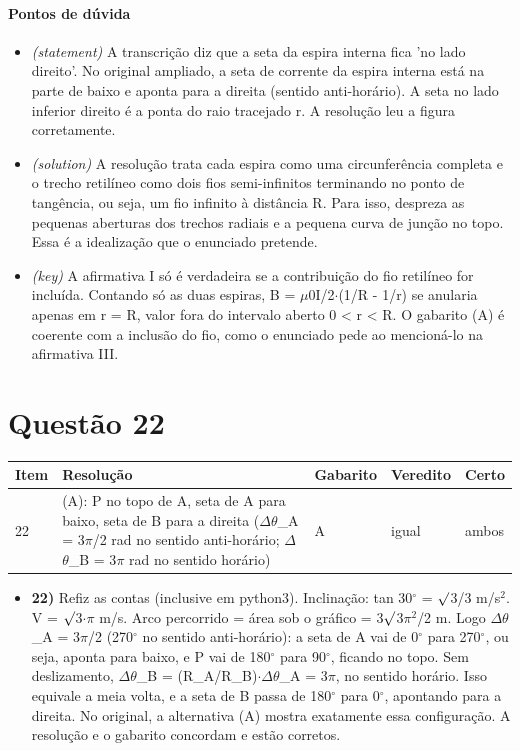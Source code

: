 \documentclass{article}%
\begin{document}
\paragraph{Pontos de dúvida}%
\begin{itemize}%
\item%
\textit{(statement)} A transcrição diz que a seta da espira interna fica 'no lado direito'. No original ampliado, a seta de corrente da espira interna está na parte de baixo e aponta para a direita (sentido anti{-}horário). A seta no lado inferior direito é a ponta do raio tracejado r. A resolução leu a figura corretamente.%
\item%
\textit{(solution)} A resolução trata cada espira como uma circunferência completa e o trecho retilíneo como dois fios semi{-}infinitos terminando no ponto de tangência, ou seja, um fio infinito à distância R. Para isso, despreza as pequenas aberturas dos trechos radiais e a pequena curva de junção no topo. Essa é a idealização que o enunciado pretende.%
\item%
\textit{(key)} A afirmativa I só é verdadeira se a contribuição do fio retilíneo for incluída. Contando só as duas espiras, B = $\mu$0I/2$\cdot$(1/R - 1/r) se anularia apenas em r = R, valor fora do intervalo aberto 0 < r < R. O gabarito (A) é coerente com a inclusão do fio, como o enunciado pede ao mencioná{-}lo na afirmativa III.%
\end{itemize}%
\section*{Questão 22}%
\begin{longtable}{@{}p{} p{} p{} p{} p{}@{}}\toprule Item & Resolução & Gabarito & Veredito & Certo \\ \midrule
22 & (A): P no topo de A, seta de A para baixo, seta de B para a direita ($\Delta$$\theta$\_A = 3$\pi$/2 rad no sentido anti{-}horário; $\Delta$$\theta$\_B = 3$\pi$ rad no sentido horário) & A & igual & ambos \\
\bottomrule\end{longtable}%
\begin{itemize}%
\item%
\textbf{22)} Refiz as contas (inclusive em python3). Inclinação: tan 30$^\circ$ = $\surd$3/3 m/s$^2$. V = $\surd$3$\cdot$$\pi$ m/s. Arco percorrido = área sob o gráfico = 3$\surd$3$\pi$$^2$/2 m. Logo $\Delta$$\theta$\_A = 3$\pi$/2 (270$^\circ$ no sentido anti{-}horário): a seta de A vai de 0$^\circ$ para 270$^\circ$, ou seja, aponta para baixo, e P vai de 180$^\circ$ para 90$^\circ$, ficando no topo. Sem deslizamento, $\Delta$$\theta$\_B = (R\_A/R\_B)$\cdot$$\Delta$$\theta$\_A = 3$\pi$, no sentido horário. Isso equivale a meia volta, e a seta de B passa de 180$^\circ$ para 0$^\circ$, apontando para a direita. No original, a alternativa (A) mostra exatamente essa configuração. A resolução e o gabarito concordam e estão corretos.%
\end{itemize}%
\end{document}
